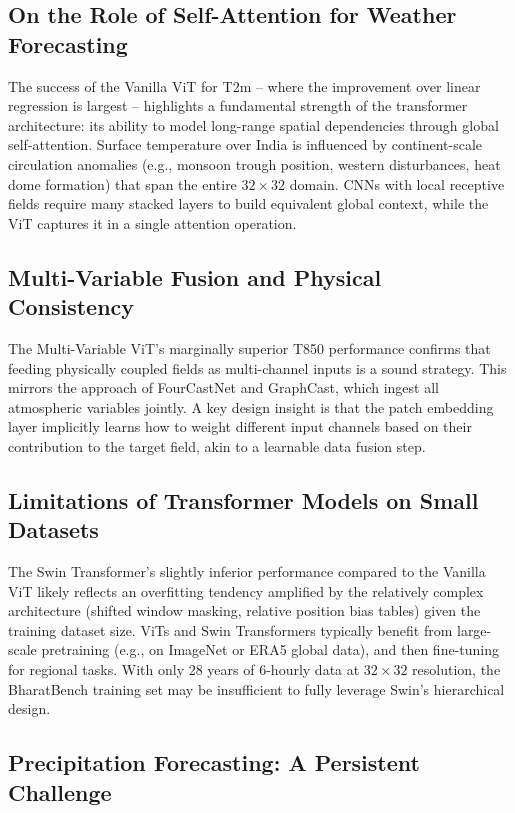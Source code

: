 \documentclass[12pt,a4paper,oneside]{report}
\begin{document}
\subsection{On the Role of Self-Attention for Weather Forecasting}

The success of the Vanilla ViT for T2m -- where the improvement over linear regression is largest -- highlights a fundamental strength of the transformer architecture: its ability to model long-range spatial dependencies through global self-attention. Surface temperature over India is influenced by continent-scale circulation anomalies (e.g., monsoon trough position, western disturbances, heat dome formation) that span the entire $32\times32$ domain. CNNs with local receptive fields require many stacked layers to build equivalent global context, while the ViT captures it in a single attention operation.

\subsection{Multi-Variable Fusion and Physical Consistency}

The Multi-Variable ViT's marginally superior T850 performance confirms that feeding physically coupled fields as multi-channel inputs is a sound strategy. This mirrors the approach of FourCastNet and GraphCast, which ingest all atmospheric variables jointly. A key design insight is that the patch embedding layer implicitly learns how to weight different input channels based on their contribution to the target field, akin to a learnable data fusion step.

\subsection{Limitations of Transformer Models on Small Datasets}

The Swin Transformer's slightly inferior performance compared to the Vanilla ViT likely reflects an overfitting tendency amplified by the relatively complex architecture (shifted window masking, relative position bias tables) given the training dataset size. ViTs and Swin Transformers typically benefit from large-scale pretraining (e.g., on ImageNet or ERA5 global data), and then fine-tuning for regional tasks. With only 28 years of 6-hourly data at $32\times32$ resolution, the BharatBench training set may be insufficient to fully leverage Swin's hierarchical design.

\subsection{Precipitation Forecasting: A Persistent Challenge}
\end{document}
